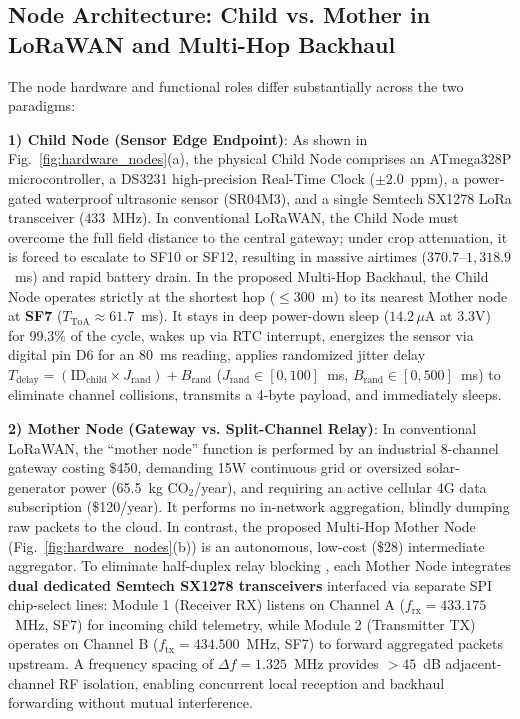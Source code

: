 \documentclass[conference]{IEEEtran}
\begin{document}
\subsection{Node Architecture: Child vs. Mother in LoRaWAN and Multi-Hop Backhaul}
The node hardware and functional roles differ substantially across the two paradigms:

\textbf{1) Child Node (Sensor Edge Endpoint)}: As shown in Fig.~\ref{fig:hardware_nodes}(a), the physical Child Node comprises an ATmega328P microcontroller, a DS3231 high-precision Real-Time Clock ($\pm 2.0$~ppm), a power-gated waterproof ultrasonic sensor (SR04M3), and a single Semtech SX1278 LoRa transceiver ($433$~MHz). In conventional LoRaWAN, the Child Node must overcome the full field distance to the central gateway; under crop attenuation, it is forced to escalate to SF10 or SF12, resulting in massive airtimes ($370.7$--$1,318.9$~ms) and rapid battery drain. In the proposed Multi-Hop Backhaul, the Child Node operates strictly at the shortest hop ($\le 300$~m) to its nearest Mother node at \textbf{SF7} ($T_{\text{ToA}} \approx 61.7$~ms). It stays in deep power-down sleep ($14.2\,\mu\text{A}$ at 3.3V) for 99.3\% of the cycle, wakes up via RTC interrupt, energizes the sensor via digital pin D6 for an 80~ms reading, applies randomized jitter delay $T_{\text{delay}} = (\text{ID}_{\text{child}} \times J_{\text{rand}}) + B_{\text{rand}}$ ($J_{\text{rand}} \in [0, 100]$~ms, $B_{\text{rand}} \in [0, 500]$~ms) to eliminate channel collisions, transmits a 4-byte payload, and immediately sleeps.

\textbf{2) Mother Node (Gateway vs. Split-Channel Relay)}: In conventional LoRaWAN, the ``mother node'' function is performed by an industrial 8-channel gateway costing \$450, demanding 15W continuous grid or oversized solar-generator power (65.5~kg $\text{CO}_2$/year), and requiring an active cellular 4G data subscription (\$120/year). It performs no in-network aggregation, blindly dumping raw packets to the cloud. In contrast, the proposed Multi-Hop Mother Node (Fig.~\ref{fig:hardware_nodes}(b)) is an autonomous, low-cost (\$28) intermediate aggregator. To eliminate half-duplex relay blocking \cite{tran2022design}, each Mother Node integrates \textbf{dual dedicated Semtech SX1278 transceivers} interfaced via separate SPI chip-select lines: Module 1 (Receiver RX) listens on Channel A ($f_{\text{rx}} = 433.175$~MHz, SF7) for incoming child telemetry, while Module 2 (Transmitter TX) operates on Channel B ($f_{\text{tx}} = 434.500$~MHz, SF7) to forward aggregated packets upstream. A frequency spacing of $\Delta f = 1.325$~MHz provides $>45$~dB adjacent-channel RF isolation, enabling concurrent local reception and backhaul forwarding without mutual interference.
\end{document}
